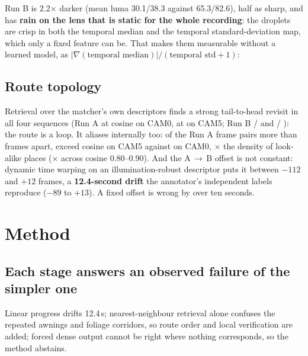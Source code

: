 \documentclass[10pt,a4paper]{article}
\begin{document}
Run B is 2.2$\times$ darker (mean luma 30.1/38.3 against 65.3/82.6), half as
sharp, and has \textbf{rain on the lens that is static for the whole recording}:
the droplets are crisp in both the temporal median and the temporal
standard-deviation map, which only a fixed feature can be. That makes them
measurable without a learned model, as
$|\nabla(\text{temporal median})| / (\text{temporal std} + 1)$:

\vspace{-2pt}


\subsection{Route topology}

Retrieval over the matcher's own descriptors finds a strong tail-to-head revisit
in all four sequences (Run A \TopologyCamZeroPair{} at cosine
\TopologyCamZeroCosine{} on CAM0, \TopologyCamFivePair{} at
\TopologyCamFiveCosine{} on CAM5; Run B \TopologyCamZeroRunBPair{}/%
\TopologyCamZeroRunBCosine{} and \TopologyCamFiveRunBPair{}/%
\TopologyCamFiveRunBCosine{}): the route is a loop. It aliases internally too:
of the \TopologyEligiblePairs{} Run A frame pairs more than \TopologySeparation{}
frames apart, \TopologyAliasFractionCamFive{} exceed cosine \TopologyCosine{} on
CAM5 against \TopologyAliasFractionCamZero{} on CAM0, \TopologyRatio$\times$ the
density of look-alike places (\TopologyRatioRange$\times$ across cosine
0.80--0.90). And the A\,$\to$\,B offset is not constant: dynamic time warping on
an illumination-robust descriptor puts it between $-112$ and $+12$ frames, a
\textbf{12.4-second drift} the annotator's independent labels reproduce ($-89$
to $+13$). A fixed offset is wrong by over ten seconds.

\section{Method}

\subsection{Each stage answers an observed failure of the simpler one}

Linear progress drifts 12.4\,s; nearest-neighbour retrieval alone confuses the
repeated awnings and foliage corridors, so route order and local verification
are added; forced dense output cannot be right where nothing corresponds, so the
method abstains.
\end{document}
